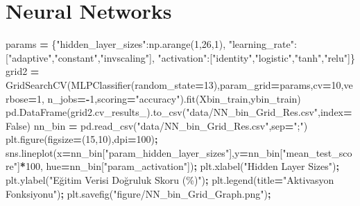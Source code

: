 \documentclass[12pt,twoside]{deuthesis}
\newenvironment{Shaded}{\begin{snugshade}}{\end{snugshade}}
\newcommand{\DecValTok}[1]{\textcolor[rgb]{0.00,0.00,0.81}{#1}}
\newcommand{\NormalTok}[1]{#1}
\newcommand{\OperatorTok}[1]{\textcolor[rgb]{0.81,0.36,0.00}{\textbf{#1}}}
\newcommand{\StringTok}[1]{\textcolor[rgb]{0.31,0.60,0.02}{#1}}
\newcommand{\VariableTok}[1]{\textcolor[rgb]{0.00,0.00,0.00}{#1}}
\begin{document}
\hypertarget{neural-networks}{%
\section{Neural Networks}\label{neural-networks}}

\scriptsize
\begin{Shaded}
\begin{Highlighting}[]
\NormalTok{params }\OperatorTok{=}\NormalTok{ \{}\StringTok{"hidden\_layer\_sizes"}\NormalTok{:np.arange(}\DecValTok{1}\NormalTok{,}\DecValTok{26}\NormalTok{,}\DecValTok{1}\NormalTok{),}
          \StringTok{"learning\_rate"}\NormalTok{:[}\StringTok{"adaptive"}\NormalTok{,}\StringTok{"constant"}\NormalTok{,}\StringTok{"invscaling"}\NormalTok{],}
          \StringTok{"activation"}\NormalTok{:[}\StringTok{"identity"}\NormalTok{,}\StringTok{"logistic"}\NormalTok{,}\StringTok{"tanh"}\NormalTok{,}\StringTok{"relu"}\NormalTok{]\}}
\NormalTok{grid2 }\OperatorTok{=}\NormalTok{ GridSearchCV(MLPClassifier(random\_state}\OperatorTok{=}\DecValTok{13}\NormalTok{),param\_grid}\OperatorTok{=}\NormalTok{params,cv}\OperatorTok{=}\DecValTok{10}\NormalTok{,verbose}\OperatorTok{=}\DecValTok{1}\NormalTok{,}
\NormalTok{                     n\_jobs}\OperatorTok{={-}}\DecValTok{1}\NormalTok{,scoring}\OperatorTok{=}\StringTok{"accuracy"}\NormalTok{).fit(Xbin\_train,ybin\_train)}
\NormalTok{pd.DataFrame(grid2.cv\_results\_).to\_csv(}\StringTok{"data/NN\_bin\_Grid\_Res.csv"}\NormalTok{,index}\OperatorTok{=}\VariableTok{False}\NormalTok{)}
\NormalTok{nn\_bin }\OperatorTok{=}\NormalTok{ pd.read\_csv(}\StringTok{"data/NN\_bin\_Grid\_Res.csv"}\NormalTok{,sep}\OperatorTok{=}\StringTok{";"}\NormalTok{)}
\NormalTok{plt.figure(figsize}\OperatorTok{=}\NormalTok{(}\DecValTok{15}\NormalTok{,}\DecValTok{10}\NormalTok{),dpi}\OperatorTok{=}\DecValTok{100}\NormalTok{)}\OperatorTok{;}
\NormalTok{sns.lineplot(x}\OperatorTok{=}\NormalTok{nn\_bin[}\StringTok{"param\_hidden\_layer\_sizes"}\NormalTok{],y}\OperatorTok{=}\NormalTok{nn\_bin[}\StringTok{"mean\_test\_score"}\NormalTok{]}\OperatorTok{*}\DecValTok{100}\NormalTok{,}
\NormalTok{             hue}\OperatorTok{=}\NormalTok{nn\_bin[}\StringTok{"param\_activation"}\NormalTok{])}\OperatorTok{;}
\NormalTok{plt.xlabel(}\StringTok{"Hidden Layer Sizes"}\NormalTok{)}\OperatorTok{;}
\NormalTok{plt.ylabel(}\StringTok{"Eğitim Verisi Doğruluk Skoru (\%)"}\NormalTok{)}\OperatorTok{;}
\NormalTok{plt.legend(title}\OperatorTok{=}\StringTok{"Aktivasyon Fonksiyonu"}\NormalTok{)}\OperatorTok{;}
\NormalTok{plt.savefig(}\StringTok{"figure/NN\_bin\_Grid\_Graph.png"}\NormalTok{)}\OperatorTok{;}
\end{Highlighting}
\end{Shaded}
\end{document}
